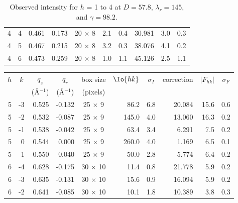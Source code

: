 \begin{table}[htbp]
\begin{tabular}{rrrrcrrrrr}
  4        & 4        & 0.461    & 0.173    & 20 $\times$ 8 & 2.1      & 0.4      & 30.981    & 3.0      & 0.3 \\
  4        & 5        & 0.467    & 0.215    & 20 $\times$ 8 & 3.2      & 0.3      & 38.076    & 4.1      & 0.2 \\
  4        & 6        & 0.473    & 0.259    & 20 $\times$ 8 & 1.0      & 1.1      & 45.126    & 2.5      & 1.1 \\
    \hline
  \end{tabular}
  \caption{Observed intensity for $h$ = 1 to 4 at $D=57.8$, $\lambda_r=145$, and 
  $\gamma=98.2$\textdegree.}
  \label{tab:obs_intensity1}
\end{table}  

\begin{table}[htbp]
  \centering
  \begin{tabular}{rrrrcrrrrr}
    \hline
    \multicolumn{1}{c}{$h$} & \multicolumn{1}{c}{$k$} & \multicolumn{1}{c}{$q_z$} & 
    \multicolumn{1}{c}{$q_r$} & \multicolumn{1}{c}{box size} & \multicolumn{1}{c}{$\Io{hk}$} & 
    \multicolumn{1}{c}{$\sigma_I$} & \multicolumn{1}{c}{correction} & \multicolumn{1}{c}{$|F_{hk}|$} &
    \multicolumn{1}{c}{$\sigma_F$} \\
     & & \multicolumn{1}{c}{(\AA$^{-1}$)} & \multicolumn{1}{c}{(\AA$^{-1}$)} & \multicolumn{1}{c}{(pixels)} & & & & \\ 
    \hline
  5        & -3       & 0.525    & -0.132   & 25 $\times$ 9  & 86.2     & 6.8      & 20.084    & 15.6     & 0.6 \\
  5        & -2       & 0.532    & -0.087   & 25 $\times$ 9  & 145.0    & 4.0      & 13.060    & 16.3     & 0.2 \\
  5        & -1       & 0.538    & -0.042   & 25 $\times$ 9  & 63.4     & 3.4      & 6.291     & 7.5      & 0.2 \\
  5        & 0        & 0.544    & 0.000    & 25 $\times$ 9  & 260.0    & 4.0      & 1.169     & 6.5      & 0.1 \\
  5        & 1        & 0.550    & 0.040    & 25 $\times$ 9  & 50.0     & 2.8      & 5.774     & 6.4      & 0.2 \\
  6        & -4       & 0.628    & -0.175   & 30 $\times$ 10 & 11.4     & 0.8      & 21.778    & 5.9      & 0.2 \\
  6        & -3       & 0.635    & -0.131   & 30 $\times$ 10 & 15.6     & 0.9      & 16.094    & 5.9      & 0.2 \\
  6        & -2       & 0.641    & -0.085   & 30 $\times$ 10 & 10.1     & 1.8      & 10.389    & 3.8      & 0.3 \\

\end{tabular}
\end{table}

